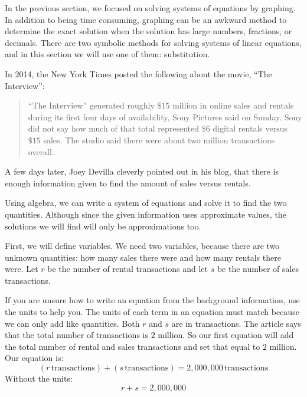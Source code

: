 \documentclass[nooutcomes]{ximera}
\begin{document}
      In the previous section,
      we focused on solving systems of equations by graphing.
      In addition to being time consuming,
      graphing can be an awkward method to determine the exact solution
      when the solution has large numbers, fractions, or decimals.
      There are two symbolic methods for solving systems of linear equations,
      and in this section we will use one of them:
      substitution.
\begin{example}
   In 2014, the New York Times
     posted the following about the movie, ``The Interview'':
\begin{quote}
 ``The Interview'' generated roughly $\$15$ million in online sales and rentals during its first four days of availability, Sony Pictures said on Sunday.
  Sony did not say how much of that total represented $\$6$ digital rentals versus $\$15$ sales.
          The studio said there were about two million transactions overall.
\end{quote}

     A few days later, Joey Devilla cleverly pointed out in his blog, that there is enough information given to find the amount of sales versus rentals.
     
\begin{explanation}
        Using algebra,
        we can write a system of equations and solve it to find the two quantities.
        Although since the given information uses approximate values,
        the solutions we will find will only be approximations too.

    First, we will define variables.
        We need two variables, because there are two unknown quantities:
        how many sales there were and how many rentals there were.
        Let $r$ be the number of rental transactions and let $s$ be the number of sales transactions.

If you are unsure how to write an equation from the background information,
        use the units to help you.
        The units of each term in an equation must match because we can only add like quantities.
        Both $r$ and $s$ are in transactions.
        The article says that the total number of transactions is $2$ million.
        So our first equation will add the total number of rental and sales transactions and set that equal to $2$ million.
        Our equation is:
$$
  (r\,\text{transactions})+(s\,\text{transactions})=2{,}000{,}000\,\text{transactions}
$$
 Without the units:
$$
r+s=2{,}000{,}000
$$


\end{explanation}
\end{example}
\end{document}
